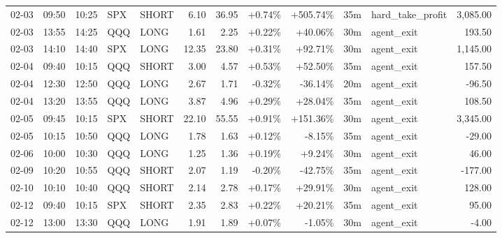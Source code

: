 \documentclass[11pt,a4paper,twoside]{article}
\begin{document}
\begin{center}
\begin{longtable}{>{\color{txtmain}}l l l l l r r r r r >{\color{txtmain}}l r}
02-03 & 09:50 & 10:25 & SPX & SHORT & 6.10 & 36.95 & \textcolor{wingreen}{+0.74\%} & \textcolor{wingreen}{+505.74\%} & 35m & hard\_take\_profit & \textcolor{wingreen}{3,085.00} \\
02-03 & 13:55 & 14:25 & QQQ & LONG & 1.61 & 2.25 & \textcolor{wingreen}{+0.22\%} & \textcolor{wingreen}{+40.06\%} & 30m & agent\_exit & \textcolor{wingreen}{193.50} \\
02-03 & 14:10 & 14:40 & SPX & LONG & 12.35 & 23.80 & \textcolor{wingreen}{+0.31\%} & \textcolor{wingreen}{+92.71\%} & 30m & agent\_exit & \textcolor{wingreen}{1,145.00} \\
02-04 & 09:40 & 10:15 & QQQ & SHORT & 3.00 & 4.57 & \textcolor{wingreen}{+0.53\%} & \textcolor{wingreen}{+52.50\%} & 35m & agent\_exit & \textcolor{wingreen}{157.50} \\
02-04 & 12:30 & 12:50 & QQQ & LONG & 2.67 & 1.71 & \textcolor{lossred}{-0.32\%} & \textcolor{lossred}{-36.14\%} & 20m & agent\_exit & \textcolor{lossred}{-96.50} \\
02-04 & 13:20 & 13:55 & QQQ & LONG & 3.87 & 4.96 & \textcolor{wingreen}{+0.29\%} & \textcolor{wingreen}{+28.04\%} & 35m & agent\_exit & \textcolor{wingreen}{108.50} \\
02-05 & 09:45 & 10:15 & SPX & SHORT & 22.10 & 55.55 & \textcolor{wingreen}{+0.91\%} & \textcolor{wingreen}{+151.36\%} & 30m & agent\_exit & \textcolor{wingreen}{3,345.00} \\
02-05 & 10:15 & 10:50 & QQQ & LONG & 1.78 & 1.63 & \textcolor{wingreen}{+0.12\%} & \textcolor{lossred}{-8.15\%} & 35m & agent\_exit & \textcolor{lossred}{-29.00} \\
02-06 & 10:00 & 10:30 & QQQ & LONG & 1.25 & 1.36 & \textcolor{wingreen}{+0.19\%} & \textcolor{wingreen}{+9.24\%} & 30m & agent\_exit & \textcolor{wingreen}{46.00} \\
02-09 & 10:20 & 10:55 & QQQ & SHORT & 2.07 & 1.19 & \textcolor{lossred}{-0.20\%} & \textcolor{lossred}{-42.75\%} & 35m & agent\_exit & \textcolor{lossred}{-177.00} \\
02-10 & 10:10 & 10:40 & QQQ & SHORT & 2.14 & 2.78 & \textcolor{wingreen}{+0.17\%} & \textcolor{wingreen}{+29.91\%} & 30m & agent\_exit & \textcolor{wingreen}{128.00} \\
02-12 & 09:40 & 10:15 & SPX & SHORT & 2.35 & 2.83 & \textcolor{wingreen}{+0.22\%} & \textcolor{wingreen}{+20.21\%} & 35m & agent\_exit & \textcolor{wingreen}{95.00} \\
02-12 & 13:00 & 13:30 & QQQ & LONG & 1.91 & 1.89 & \textcolor{wingreen}{+0.07\%} & \textcolor{lossred}{-1.05\%} & 30m & agent\_exit & \textcolor{lossred}{-4.00} \\

\end{longtable}
\end{center}
\end{document}
